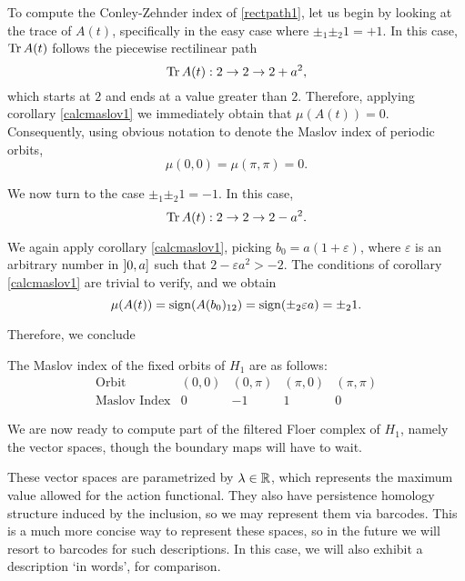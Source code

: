 To compute the Conley-Zehnder index of \eqref{rectpath1}, let us begin by looking at the trace of $A(t)$, specifically in the easy case where $\pm_1 \pm_2 1 = +1$. In this case, $\operatorname{Tr} A(t)$ follows the piecewise rectilinear path
\begin{equation}
\operatorname{Tr} A(t) : 2 \to 2 \to 2 + a^2,
\end{equation}
which starts at $2$ and ends at a value greater than $2$. Therefore, applying corollary \ref{calcmaslov1} we immediately obtain that $\mu(A(t)) = 0$. Consequently, using obvious notation to denote the Maslov index of periodic orbits,
\begin{equation}
\mu(0,0) = \mu(\pi,\pi) = 0.
\end{equation}

We now turn to the case $\pm_1 \pm_2 1 = -1$. In this case,
\begin{equation}
\operatorname{Tr} A(t) : 2 \to 2 \to 2 - a^2.
\end{equation}

We again apply corollary \ref{calcmaslov1}, picking $b_0 = a(1 + \varepsilon)$, where $\varepsilon$ is an arbitrary number in $\linterval 0 a$ such that $2 - \varepsilon a^2 > -2$. The conditions of corollary \ref{calcmaslov1} are trivial to verify, and we obtain
\begin{equation}
\mu(A(t)) = \operatorname{sign}(A(b_0)_{12}) = \operatorname{sign}(\pm_2 \varepsilon a) = \pm_2 1.
\end{equation}

Therefore, we conclude
\begin{prop}
The Maslov index of the fixed orbits of $H_1$ are as follows:
\begin{equation}
\begin{array}{c|c|c|c|c}
\text{Orbit} & (0,0) & (0,\pi) & (\pi,0) & (\pi,\pi)\\
\hline
\text{Maslov Index} & 0 & -1 & 1 & 0
\end{array}
\end{equation}
\end{prop}

We are now ready to compute part of the filtered Floer complex of $H_1$, namely the vector spaces, though the boundary maps will have to wait.

These vector spaces are parametrized by $\lambda \in \mathbb{R}$, which represents the maximum value allowed for the action functional. They also have persistence homology structure induced by the inclusion, so we may represent them via barcodes. This is a much more concise way to represent these spaces, so in the future we will resort to barcodes for such descriptions. In this case, we will also exhibit a description `in words', for comparison.

